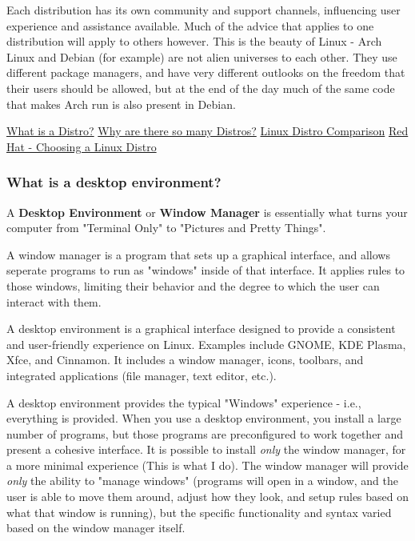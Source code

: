 \documentclass[11pt]{article}
\begin{document}
Each distribution has its own community and support channels, influencing user experience and assistance available. Much of the advice that applies to one distribution will apply to others however. This is the beauty of Linux - Arch Linux and Debian (for example) are not alien universes to each other. They use different package managers, and have very different outlooks on the freedom that their users should be allowed, but at the end of the day much of the same code that makes Arch run is also present in Debian. 

\href{https://www.geeksforgeeks.org/what-are-linux-distributions/}{What is a Distro?}
\href{https://itsfoss.com/what-is-linux/}{Why are there so many Distros?}
\href{https://en.wikipedia.org/wiki/Comparison\_of\_Linux\_distributions}{Linux Distro Comparison}
\href{https://www.redhat.com/en/topics/linux/whats-the-best-linux-distro-for-you}{Red Hat - Choosing a Linux Distro}

\subsubsection{What is a desktop environment?}
\label{sec:org9fbb467}
A \textbf{Desktop Environment} or \textbf{Window Manager} is essentially what turns your computer from "Terminal Only" to "Pictures and Pretty Things".

A window manager is a program that sets up a graphical interface, and allows seperate programs to run as "windows" inside of that interface. It applies rules to those windows, limiting their behavior and the degree to which the user can interact with them.

A desktop environment is a graphical interface designed to provide a consistent and user-friendly experience on Linux. Examples include GNOME, KDE Plasma, Xfce, and Cinnamon. It includes a window manager, icons, toolbars, and integrated applications (file manager, text editor, etc.).

A desktop environment provides the typical "Windows" experience - i.e., everything is provided. When you use a desktop environment, you install a large number of programs, but those programs are preconfigured to work together and present a cohesive interface. It is possible to install \emph{only} the window manager, for a more minimal experience (This is what I do). The window manager will provide \emph{only} the ability to "manage windows" (programs will open in a window, and the user is able to move them around, adjust how they look, and setup rules based on what that window is running), but the specific functionality and syntax varied based on the window manager itself.
\end{document}
